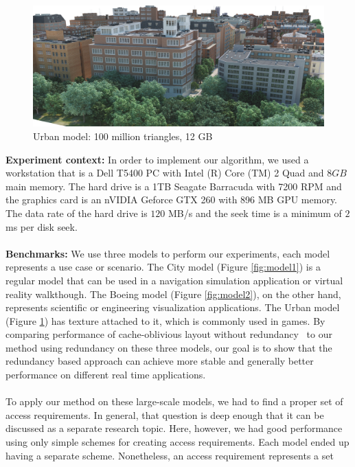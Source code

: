 \begin{figure}[h!]
  \centering
  \includegraphics[width=\columnwidth]{densecity.jpg}
  \caption{Urban model: 100 million triangles, 12 GB }
  \label{fig:model3}
\end{figure}


\textbf{Experiment context:}
In order to implement our algorithm, we used a workstation that is a Dell T5400 PC with Intel (R) Core (TM) 2 Quad and $8GB$ main memory. The hard drive is a 1TB Seagate Barracuda with 7200 RPM and the graphics card is an nVIDIA Geforce GTX 260 with 896 MB GPU memory. The data rate of the hard drive is $120$ MB/s and the seek time is a minimum of $2$ ms per disk seek.\\
\\
\textbf{Benchmarks:}
We use three models to perform our experiments, each model represents a use
case or scenario. The City model (Figure \ref{fig:model1}) is a regular model
that can be used in a navigation simulation application or virtual reality
walkthough. The Boeing model (Figure \ref{fig:model2}), on the other hand,
represents scientific or engineering visualization applications. The Urban
model (Figure \ref{fig:model3}) has texture attached to it, which is commonly
used in games. By comparing performance of cache-oblivious layout without
redundancy~\cite{cacheobliviouslayout} to our method using redundancy on these three models, our goal
is to show that the redundancy based approach can achieve more stable and generally
better performance on different real time applications. \\
\\ To apply our method on these large-scale models, we had to find a proper set
of access requirements. In general, that question is deep enough that it can be
discussed as a separate research topic. Here, however, we had good performance
using only simple schemes for creating access requirements. Each model ended up
having a separate scheme. Nonetheless, an access requirement represents a set
